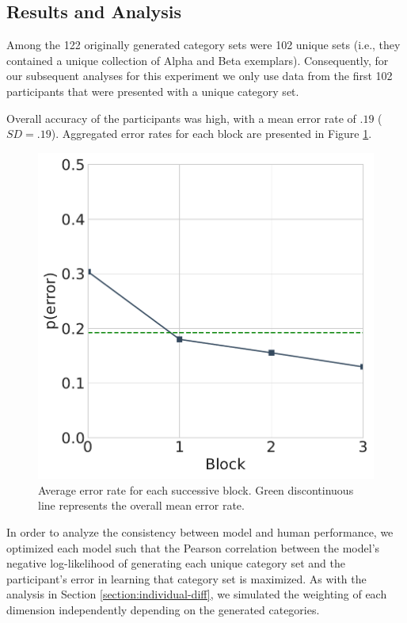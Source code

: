\subsection{Results and Analysis}

Among the 122 originally generated category sets were 102 unique sets (i.e.,
they contained a unique collection of Alpha and Beta exemplars). Consequently,
for our subsequent analyses for this experiment we only use data from the first
102 participants that were presented with a unique category set.

Overall accuracy of the participants was high, with a mean error rate of $.19$
($SD = .19$). Aggregated error rates for each block are presented in Figure
\ref{fig:learningcurve}.

\begin{figure}
    \begin{center}
    \includegraphics[width=\textwidth/2]{figs/e3-learningcurve.pdf}
    \caption{Average error rate for each successive block. Green discontinuous
line represents the overall mean error rate.}
    \label{fig:learningcurve}
    \end{center}
\end{figure}

In order to analyze the consistency between model and human performance, we
optimized each model such that the Pearson correlation between the model's
negative log-likelihood of generating each unique category set and the
participant's error in learning that category set is maximized. As with the
analysis in Section \ref{section:individual-diff}, we simulated the weighting of
each dimension independently depending on the generated categories.

